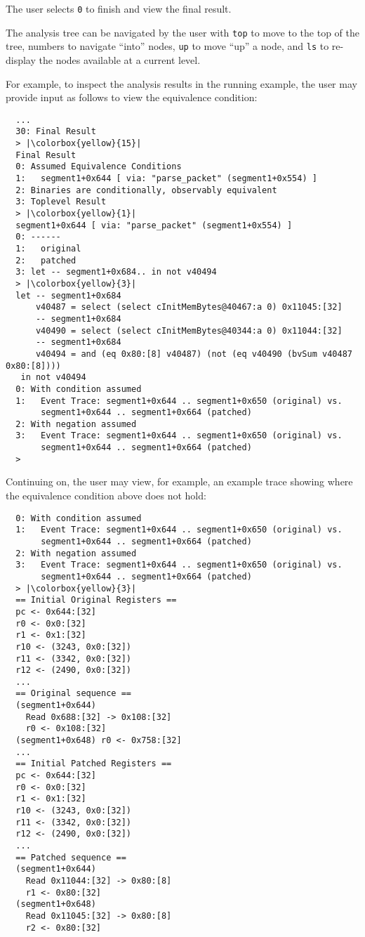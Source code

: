 The user selects \texttt{0} to finish and view the final result.

The \pate{} analysis tree can be navigated by the user with \texttt{top} to move to the top of the tree, numbers to navigate ``into'' nodes, \texttt{up} to move ``up'' a node, and \texttt{ls} to re-display the nodes available at a current level.

For example, to inspect the analysis results in the running example, the user may provide input as follows to view the equivalence condition:

\begin{lstlisting}
  ...
  30: Final Result
  > |\colorbox{yellow}{15}|
  Final Result
  0: Assumed Equivalence Conditions
  1:   segment1+0x644 [ via: "parse_packet" (segment1+0x554) ]
  2: Binaries are conditionally, observably equivalent
  3: Toplevel Result
  > |\colorbox{yellow}{1}|
  segment1+0x644 [ via: "parse_packet" (segment1+0x554) ]
  0: ------
  1:   original
  2:   patched
  3: let -- segment1+0x684.. in not v40494
  > |\colorbox{yellow}{3}|
  let -- segment1+0x684
      v40487 = select (select cInitMemBytes@40467:a 0) 0x11045:[32]
      -- segment1+0x684
      v40490 = select (select cInitMemBytes@40344:a 0) 0x11044:[32]
      -- segment1+0x684
      v40494 = and (eq 0x80:[8] v40487) (not (eq v40490 (bvSum v40487 0x80:[8])))
   in not v40494
  0: With condition assumed
  1:   Event Trace: segment1+0x644 .. segment1+0x650 (original) vs.
       segment1+0x644 .. segment1+0x664 (patched)
  2: With negation assumed
  3:   Event Trace: segment1+0x644 .. segment1+0x650 (original) vs.
       segment1+0x644 .. segment1+0x664 (patched)
  >
\end{lstlisting}

Continuing on, the user may view, for example, an example trace showing where the equivalence condition above does not hold:

\begin{lstlisting}
  0: With condition assumed
  1:   Event Trace: segment1+0x644 .. segment1+0x650 (original) vs.
       segment1+0x644 .. segment1+0x664 (patched)
  2: With negation assumed
  3:   Event Trace: segment1+0x644 .. segment1+0x650 (original) vs.
       segment1+0x644 .. segment1+0x664 (patched)
  > |\colorbox{yellow}{3}|
  == Initial Original Registers ==
  pc <- 0x644:[32]
  r0 <- 0x0:[32]
  r1 <- 0x1:[32]
  r10 <- (3243, 0x0:[32])
  r11 <- (3342, 0x0:[32])
  r12 <- (2490, 0x0:[32])
  ...
  == Original sequence ==
  (segment1+0x644)
    Read 0x688:[32] -> 0x108:[32]
    r0 <- 0x108:[32]
  (segment1+0x648) r0 <- 0x758:[32]
  ...
  == Initial Patched Registers ==
  pc <- 0x644:[32]
  r0 <- 0x0:[32]
  r1 <- 0x1:[32]
  r10 <- (3243, 0x0:[32])
  r11 <- (3342, 0x0:[32])
  r12 <- (2490, 0x0:[32])
  ...
  == Patched sequence ==
  (segment1+0x644)
    Read 0x11044:[32] -> 0x80:[8]
    r1 <- 0x80:[32]
  (segment1+0x648)
    Read 0x11045:[32] -> 0x80:[8]
    r2 <- 0x80:[32]
\end{lstlisting}


